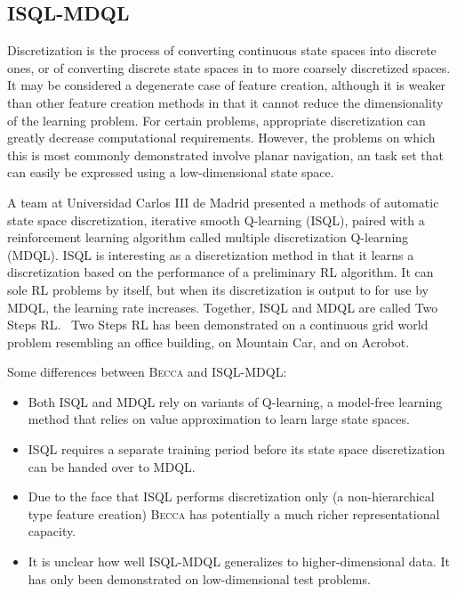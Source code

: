 \subsection{ISQL-MDQL} 
Discretization is the process of converting continuous state spaces into discrete ones, or of converting discrete state spaces in to more coarsely discretized spaces. It may be considered a degenerate case of feature creation, although it is weaker than other feature creation methods in that it cannot reduce the dimensionality of the learning problem. For certain problems, appropriate discretization can greatly decrease computational requirements. However, the problems on which this is most commonly demonstrated involve planar navigation, an task set that can easily be expressed using a low-dimensional state space.

A team at Universidad Carlos III de Madrid presented a methods of automatic state space discretization, iterative smooth Q-learning (ISQL), paired with a reinforcement learning algorithm called multiple discretization Q-learning (MDQL). ISQL is interesting as a discretization method in that it learns a discretization based on the performance of a preliminary RL algorithm. It can sole RL problems by itself, but when its discretization is output to for use by MDQL, the learning rate increases. Together, ISQL and MDQL are called Two Steps RL.~\cite{fernandez08} Two Steps RL has been demonstrated on a continuous grid world problem resembling an office building, on Mountain Car, and on Acrobot.

Some differences between \textsc{Becca} and ISQL-MDQL:

\begin{itemize}
\item Both ISQL and MDQL rely on variants of Q-learning, a model-free learning method that relies on value approximation to learn large state spaces.
\item ISQL requires a separate training period before its state space discretization can be handed over to MDQL.
\item Due to the face that ISQL performs discretization only (a non-hierarchical type feature creation) \textsc{Becca} has potentially a much richer representational capacity.
\item It is unclear how well ISQL-MDQL generalizes to higher-dimensional data. It has only been demonstrated on low-dimensional test problems.
\end{itemize}


